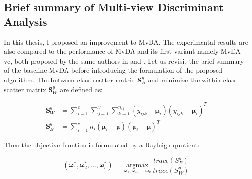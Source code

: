 
\subsection{Brief summary of Multi-view Discriminant Analysis}
    In this thesis, I proposed an improvement to MvDA.
    The experimental results are also compared to the performance of MvDA and its first variant namely MvDA-vc, both proposed by the same authors in \cite{kan2015multi} and \cite{kan2016multi}.
    Let us revisit the brief summary of the baseline MvDA before introducing the formulation of the proposed algorithm.
    The between-class scatter matrix $\boldsymbol{S}_B^y$ and minimize the within-class scatter matrix $\boldsymbol{S}_W^y$ are defined as: 

    \begin{align}
        \boldsymbol{S}_W^y &= \sum_{i=1}^{c}\sum_{j=1}^{v}\sum_{k=1}^{n_{ij}}(y_{ijk}-\boldsymbol{\mu}_i)(y_{ijk}-\boldsymbol{\mu}_i)^T \label{eq:MvDA_Sw}\\
        \boldsymbol{S}_B^y &= \sum_{i=1}^{c}n_i(\boldsymbol{\mu}_i - \boldsymbol{\mu})(\boldsymbol{\mu}_i - \boldsymbol{\mu})^T \label{eq:MvDA_Sb}
    \end{align}

    Then the objective function is formulated by a Rayleigh quotient:

    \begin{equation}
        (\boldsymbol{\omega}_1^*,\boldsymbol{\omega}_2^*, ..., \boldsymbol{\omega}_v^*) = \operatorname*{argmax}_{\boldsymbol{\omega}_1, \boldsymbol{\omega}_2,..., \boldsymbol{\omega}_v}\frac{trace({S}_B^y)}{trace({S}_W^y)}
        \label{eq:MvDA}
    \end{equation}


